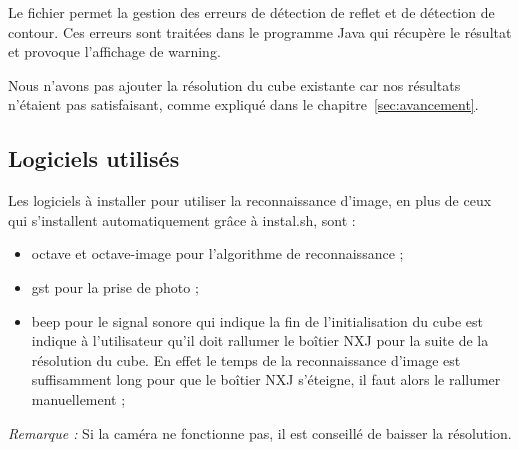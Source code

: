   Le fichier permet la gestion des erreurs de détection de reflet et de détection de contour. 
  Ces erreurs sont traitées dans le programme Java qui récupère le résultat et provoque l'affichage de warning. 

  Nous n'avons pas ajouter la résolution du cube existante car nos résultats n'étaient pas satisfaisant, comme expliqué dans le chapitre~\ref{sec:avancement}. 

  \subsection*{Logiciels utilisés}

  Les logiciels à installer pour utiliser la reconnaissance d'image, en plus de ceux qui s'installent automatiquement grâce à instal.sh, sont : 
\begin{itemize}
  \item octave et octave-image pour l'algorithme de reconnaissance ; 
  \item gst pour la prise de photo ; 
  \item beep pour le signal sonore qui indique la fin de l'initialisation du cube est indique à l'utilisateur qu'il doit rallumer le boîtier NXJ pour la suite de la résolution du cube. En effet le temps de la reconnaissance d'image est suffisamment long pour que le boîtier NXJ s'éteigne, il faut alors le rallumer manuellement ; 
\end{itemize}

\textit{Remarque : } Si la caméra ne fonctionne pas, il est conseillé de baisser la résolution. 

